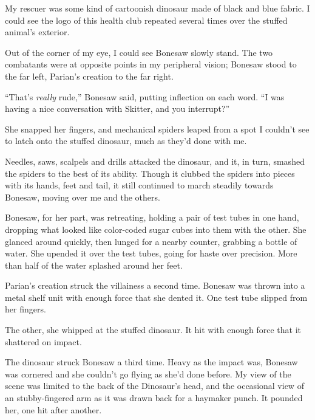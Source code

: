 My rescuer was some kind of cartoonish dinosaur made of black and blue fabric.  I could see the logo of this health club repeated several times over the stuffed animal's exterior.



Out of the corner of my eye, I could see Bonesaw slowly stand.  The two combatants were at opposite points in my peripheral vision; Bonesaw stood to the far left, Parian's creation to the far right.



``That's \emph{really} rude,'' Bonesaw said, putting inflection on each word.  ``I was having a nice conversation with Skitter, and you interrupt?''



She snapped her fingers, and mechanical spiders leaped from a spot I couldn't see to latch onto the stuffed dinosaur, much as they'd done with me.



Needles, saws, scalpels and drills attacked the dinosaur, and it, in turn, smashed the spiders to the best of its ability.  Though it clubbed the spiders into pieces with its hands, feet and tail, it still continued to march steadily towards Bonesaw, moving over me and the others.



Bonesaw, for her part, was retreating, holding a pair of test tubes in one hand, dropping what looked like color-coded sugar cubes into them with the other.  She glanced around quickly, then lunged for a nearby counter, grabbing a bottle of water.  She upended it over the test tubes, going for haste over precision.  More than half of the water splashed around her feet.



Parian's creation struck the villainess a second time.  Bonesaw was thrown into a metal shelf unit with enough force that she dented it.  One test tube slipped from her fingers.



The other, she whipped at the stuffed dinosaur.  It hit with enough force that it shattered on impact.



The dinosaur struck Bonesaw a third time.  Heavy as the impact was, Bonesaw was cornered and she couldn't go flying as she'd done before.  My view of the scene was limited to the back of the Dinosaur's head, and the occasional view of an stubby-fingered arm as it was drawn back for a haymaker punch.  It pounded her, one hit after another.



